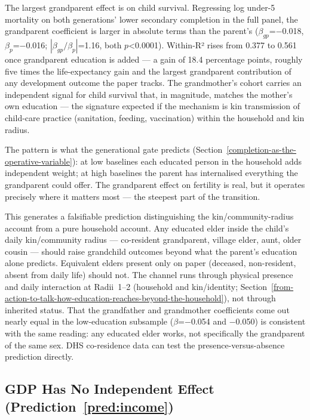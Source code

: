 \documentclass[12pt,letterpaper]{article}
\begin{document}
The largest grandparent effect is on child survival. Regressing log
under-5 mortality on both generations' lower secondary completion in
the full panel, the grandparent coefficient is larger in absolute
terms than the parent's ($\beta_{gp}$=$-$0.018, $\beta_p$=$-$0.016;
$|\beta_{gp}/\beta_p|$=1.16, both $p$\textless0.0001). Within-R² rises
from 0.377 to 0.561 once grandparent education is added --- a gain of
18.4 percentage points, roughly five times the life-expectancy gain
and the largest grandparent contribution of any development outcome
the paper tracks. The grandmother's cohort carries an independent
signal for child survival that, in magnitude, matches the mother's
own education --- the signature expected if the mechanism is kin
transmission of child-care practice (sanitation, feeding,
vaccination) within the household and kin radius.

The pattern is what the generational gate predicts
(Section~\ref{completion-as-the-operative-variable}): at low baselines
each educated person in the household adds independent weight; at high
baselines the parent has internalised everything the grandparent could
offer. The grandparent effect on fertility is real, but it operates
precisely where it matters most --- the steepest part of the
transition.

This generates a falsifiable prediction distinguishing the
kin/community-radius account from a pure household account. Any educated elder inside
the child's daily kin/community radius --- co-resident grandparent,
village elder, aunt, older cousin --- should raise grandchild outcomes
beyond what the parent's education alone predicts. Equivalent
elders present only on paper (deceased, non-resident, absent from daily
life) should not. The channel runs through physical presence and daily
interaction at Radii~1--2 (household and kin/identity;
Section~\ref{from-action-to-talk-how-education-reaches-beyond-the-household}),
not through inherited status. That the grandfather and grandmother
coefficients come out nearly equal in the low-education subsample
($\beta$=$-$0.054 and $-$0.050) is consistent with the same reading: any
educated elder works, not specifically the grandparent of the same
sex. DHS co-residence data can test the presence-versus-absence
prediction directly.

\subsection{GDP Has No Independent Effect (Prediction~\ref{pred:income})}\label{gdp-has-no-independent-effect}
\end{document}
